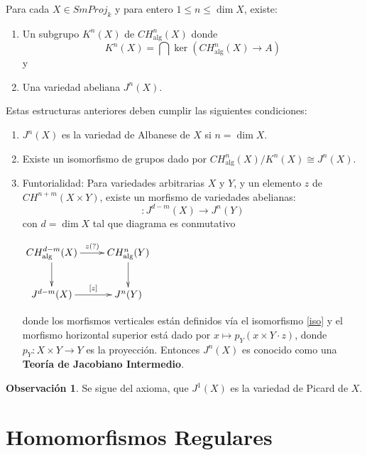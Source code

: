 \documentclass[10pt]{amsart}
\theoremstyle{definition}
\newtheorem{obs}[definition]{Observaci\'on}
\theoremstyle{remark}
\theoremstyle{definition}
\begin{document}
 Para cada $X \in SmProj_{\mathit{k}}$ y para entero $1 \leq n \leq\dim X$, existe:
\begin{enumerate}
\item Un subgrupo $K^{n}(X)$ de $CH^{n}_{\mathrm{alg}}(X)$ donde 
\begin{equation*}
K^{n}(X)=\bigcap \ker(CH^{n}_{\mathrm{alg}}(X) \rightarrow A)
\end{equation*} 
y
 \item Una variedad abeliana $J^{n}(X)$.
\end{enumerate}\label{CondJI}
Estas estructuras anteriores deben cumplir las siguientes condiciones:
\begin{enumerate}
\item $J^{n}(X)$ es la variedad de Albanese de $X$ si $n=\dim X$.
\item\label{iso}  Existe un isomorfismo de grupos dado por $CH^{n}_{\mathrm{alg}}(X)/K^{n}(X) \cong J^{n}(X)$.
\item Funtorialidad: Para variedades arbitrarias $X$ y $Y$, y un elemento $z$ de $CH^{n+m}(X \times Y)$, existe un morfismo de variedades abelianas:
\begin{equation*}
[z]:J^{d-m}(X) \rightarrow J^{n}(Y)
\end{equation*}
con $d=\dim X$ tal que diagrama es conmutativo
\begin{center}
          $\xymatrix{
           CH^{d-m}_{\mathrm{alg}}(X)\ar[d]\ar[r]^-{z(?)} & CH^{n}_{\mathrm{alg}}(Y)\ar[d]\\
            J^{d-m}(X)\ar[r]^-{[z]}& J^{n}(Y)}
          $ 
         \end{center}
donde los morfismos verticales están definidos vía el isomorfismo \ref{iso} y el morfismo horizontal superior está dado por $x \mapsto p_{Y}(x \times Y \cdot z)$, donde $p_{Y}: X \times Y \rightarrow Y$ es la proyección. Entonces $J^{n}(X)$ es conocido como una \textbf{Teoría de Jacobiano Intermedio}.
\end{enumerate}

\begin{obs}
 Se sigue del axioma, que $J^{1}(X)$ es la variedad de Picard de $X$.
\end{obs}





\section{Homomorfismos Regulares}
\end{document}
